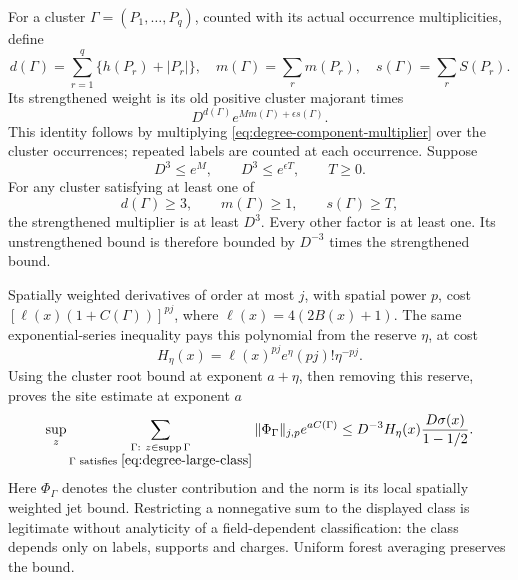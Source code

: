 For a cluster $\Gamma=(P_1,\ldots,P_q)$, counted with its actual
occurrence multiplicities, define
\[
 d(\Gamma)=\sum_{r=1}^q\{h(P_r)+|P_r|\},\quad
 m(\Gamma)=\sum_r m(P_r),\quad
 s(\Gamma)=\sum_r S(P_r).
\]
Its strengthened weight is its old positive cluster majorant times
\[
             D^{d(\Gamma)}e^{Mm(\Gamma)+\epsilon s(\Gamma)}.
\]
This identity follows by multiplying
\eqref{eq:degree-component-multiplier} over the cluster occurrences;
repeated labels are counted at each occurrence. Suppose
\[
 D^3\le e^M,\qquad D^3\le e^{\epsilon T},\qquad T\ge0.
\]
For any cluster satisfying at least one of
\begin{equation}\label{eq:degree-large-class}
 d(\Gamma)\ge3,\qquad m(\Gamma)\ge1,\qquad s(\Gamma)\ge T,
\end{equation}
the strengthened multiplier is at least $D^3$. Every other factor
is at least one. Its unstrengthened bound is therefore bounded by
$D^{-3}$ times the strengthened bound.

Spatially weighted derivatives of order at most $j$, with spatial
power $p$, cost $[\ell(x)(1+C(\Gamma))]^{pj}$, where
$\ell(x)=4(2B(x)+1)$. The same exponential-series inequality pays
this polynomial from the reserve $\eta$, at cost
\[
 H_\eta(x)=\ell(x)^{pj}e^\eta(pj)!\eta^{-pj}.
\]
Using the cluster root bound at exponent $a+\eta$, then removing
this reserve, proves the site estimate at exponent $a$
\begin{equation}\label{eq:degree-large-budget}
 \sup_z\sum_{\substack{\Gamma:\ z\in\operatorname{supp}\Gamma\\
                   \Gamma\text{ satisfies }\eqref{eq:degree-large-class}}}
       \|\Phi_\Gamma\|_{j,p}e^{aC(\Gamma)}
                  \le D^{-3}H_\eta(x)\frac{D\sigma(x)}{1-1/2}.
\end{equation}
Here $\Phi_\Gamma$ denotes the cluster contribution and the norm is
its local spatially weighted jet bound. Restricting a nonnegative
sum to the displayed class is legitimate without analyticity of a
field-dependent classification: the class depends only on labels,
supports and charges. Uniform forest averaging preserves the bound.

